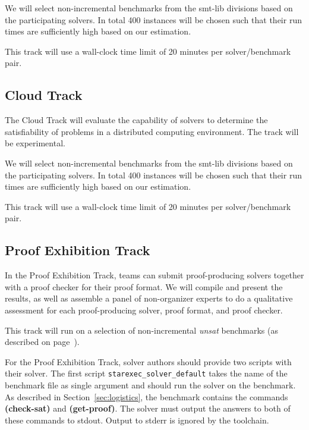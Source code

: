 \documentclass[12pt]{article}
\newcommand{\akey}[1]{\textbf{#1}\xspace}
\newcommand{\cloudtrack}{Cloud Track\xspace}
\newcommand{\prooftrack}{Proof Exhibition Track\xspace}
\begin{document}
We will select non-incremental benchmarks from the smt-lib divisions
based on the participating solvers.  In total 400 instances will be
chosen such that their run times are sufficiently high based on our
estimation.

This track will use a wall-clock time limit of 20 minutes per
solver/benchmark pair.

\subsection{\cloudtrack{}}
The \cloudtrack{} will evaluate the capability of solvers to determine
the satisfiability of problems in a distributed computing environment.
The track will be experimental.

We will select non-incremental benchmarks from the smt-lib divisions
based on the participating solvers.  In total 400 instances will be
chosen such that their run times are sufficiently high based on our
estimation.

This track will use a wall-clock time limit of 20 minutes per
solver/benchmark pair.

\subsection{\prooftrack}
\label{sec:exec:proof}

In the \prooftrack, teams can submit proof-producing solvers together
with a proof checker for their proof format.  We will compile and
present the results, as well as assemble a panel of non-organizer
experts to do a qualitative assessment for each proof-producing
solver, proof format, and proof checker.

This track will run on a selection of non-incremental \emph{unsat} benchmarks
(as described on page~\pageref{benchmark-selection}).

For the \prooftrack, solver authors should provide two scripts
with their solver.  The first script
\texttt{starexec\_solver\_default} takes the name of the benchmark file as
single argument and should run the solver on the benchmark.
As described in Section~\ref{sec:logistics}, the benchmark
contains the commands \akey{(check-sat)} and \akey{(get-proof)}.
The solver must output the answers to both of these commands to stdout.
Output to stderr is ignored by the toolchain.
\end{document}
